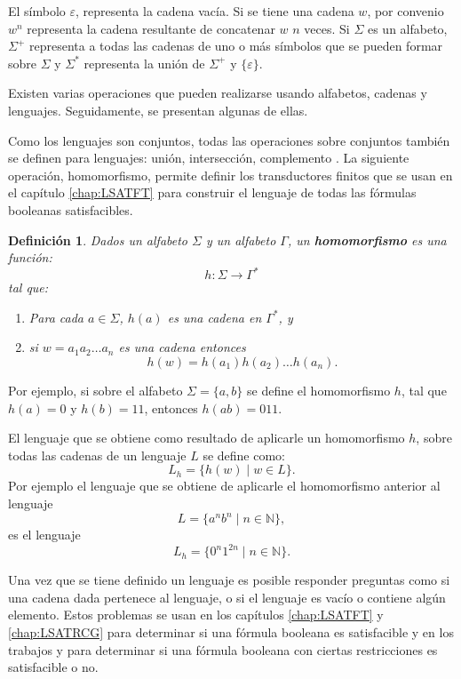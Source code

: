 \documentclass[12pt]{article}
\newtheorem{definition}{Definición}
\begin{document}
El símbolo $\varepsilon$, representa la cadena vacía. Si se tiene una cadena $w$, por convenio  $w^n$ representa la cadena
resultante de concatenar $w$ $n$ veces. Si $\Sigma$ es un alfabeto, $\Sigma^{+}$ representa a todas las cadenas de uno o más 
símbolos que se pueden formar sobre $\Sigma$ y  $\Sigma^*$  representa la unión de $\Sigma^{+}$ y $\{\varepsilon\}$.

Existen varias operaciones que pueden realizarse usando alfabetos, cadenas y lenguajes. Seguidamente, se presentan algunas de ellas.

Como los lenguajes son conjuntos, todas las operaciones sobre conjuntos también se definen para lenguajes: unión, intersección, complemento \cite{authomataTheory}.
La siguiente operación, homomorfismo, permite definir los transductores finitos que se usan en el capítulo \ref{chap:LSATFT} para 
construir el lenguaje de todas las fórmulas booleanas satisfacibles.

\begin{definition}
  Dados un alfabeto \( \Sigma \) y un alfabeto \( \Gamma \), un \textbf{homomorfismo} es una función:
  \[
    h: \Sigma \to \Gamma^*
  \]
  tal que:
  \begin{enumerate}
    \item Para cada \( a \in \Sigma \), \( h(a) \) es una cadena en \( \Gamma^* \), y
    \item si $w=a_1a_2\ldots a_n$ es una cadena entonces
          $$h(w)=h(a_1)h(a_2)\ldots h(a_n).$$
  \end{enumerate}
\end{definition}

Por ejemplo, si sobre el alfabeto $\Sigma=\{a,b\}$ se define el homomorfismo $h$, tal que $h(a)=0$ y $h(b)=11$, entonces
$h(ab)=011$.

El lenguaje que se obtiene como resultado de aplicarle un homomorfismo $h$, sobre todas las cadenas de un lenguaje $L$ se define como:
$$L_h=\{h(w)\mid w\in L\}.$$
Por ejemplo el lenguaje que se obtiene de aplicarle el homomorfismo anterior al lenguaje $$L=\{a^nb^n\mid n\in \mathbb{N}\},$$ es el lenguaje
$$L_h=\{0^n1^{2n}\mid n\in \mathbb{N}\}.$$

Una vez que se tiene definido un lenguaje es posible responder preguntas como si una cadena dada pertenece al lenguaje, o si el lenguaje es vacío o contiene algún elemento.
Estos problemas se usan en los capítulos \ref{chap:LSATFT} y \ref{chap:LSATRCG} para determinar si una fórmula booleana
es satisfacible y en los trabajos \cite{aCFSAT} y \cite{aSRCSAT} para determinar si una fórmula booleana con ciertas restricciones es 
satisfacible o no.
\end{document}
